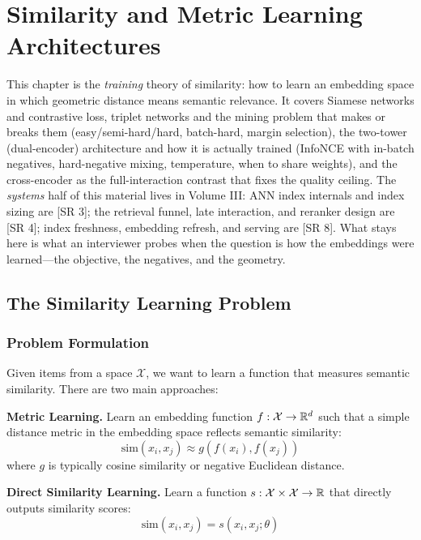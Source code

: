 \chapter{Similarity and Metric Learning Architectures}
\label{chap:similarity_architectures}

\begin{tldr}
This chapter is the \emph{training} theory of similarity: how to learn an embedding space in which geometric distance means semantic relevance. It covers Siamese networks and contrastive loss, triplet networks and the mining problem that makes or breaks them (easy/semi-hard/hard, batch-hard, margin selection), the two-tower (dual-encoder) architecture and how it is actually trained (InfoNCE with in-batch negatives, hard-negative mixing, temperature, when to share weights), and the cross-encoder as the full-interaction contrast that fixes the quality ceiling. The \emph{systems} half of this material lives in Volume III: ANN index internals and index sizing are [SR 3]; the retrieval funnel, late interaction, and reranker design are [SR 4]; index freshness, embedding refresh, and serving are [SR 8]. What stays here is what an interviewer probes when the question is how the embeddings were learned---the objective, the negatives, and the geometry.
\end{tldr}

\section{The Similarity Learning Problem}
\label{sec:similarity_problem}

\subsection{Problem Formulation}

Given items from a space $\mathcal{X}$, we want to learn a function that measures semantic similarity. There are two main approaches:

\textbf{Metric Learning.} Learn an embedding function $f: \mathcal{X} \to \mathbb{R}^d$ such that a simple distance metric in the embedding space reflects semantic similarity:
\begin{equation}
\text{sim}(x_i, x_j) \approx g(f(x_i), f(x_j))
\end{equation}
where $g$ is typically cosine similarity or negative Euclidean distance.

\textbf{Direct Similarity Learning.} Learn a function $s: \mathcal{X} \times \mathcal{X} \to \mathbb{R}$ that directly outputs similarity scores:
\begin{equation}
\text{sim}(x_i, x_j) = s(x_i, x_j; \theta)
\end{equation}

